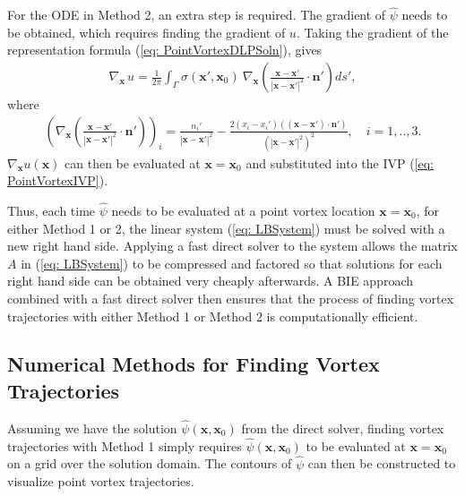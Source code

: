 \documentclass{sfuthesis}
\begin{document}
For the ODE in Method 2, an extra step is required. The gradient of $\hat{\psi}$ needs to be obtained, which requires finding the gradient of $u$.  
Taking the gradient of the representation formula (\ref{eq: PointVortexDLPSoln}), gives
\begin{align*}
	\nabla_{\mathbf{x}\ } u= \frac{1}{2\pi} \int_\Gamma \sigma(\mathbf{x}',\mathbf{x}_0) \ \nabla_{\mathbf{x}} \left(\frac{\mathbf{x}-\mathbf{x}'}{ {|\mathbf{x}-\mathbf{x}'|}^2} \cdot \mathbf{n}' \right) ds', 
\end{align*}
where 
\begin{align*}
	\left( \nabla_{\mathbf{x}} \left( \frac{ \mathbf{x}-\mathbf{x}'}{ {|\mathbf{x}-\mathbf{x}'|}^2} \cdot \mathbf{n}' \right) \right)_i = \frac{{n_i}'}{{|\mathbf{x}-\mathbf{x}'|}^2 } - \frac{2 (x_i -{x_i}') \left( (\mathbf{x}-\mathbf{x}') \cdot \mathbf{n}' \right)}{{({|\mathbf{x}- \mathbf{x}'|}^2)}^2}, \quad i=1,..,3.
\end{align*}
$\nabla_{\mathbf{x}} u(\mathbf{x})$ can then be evaluated at $\mathbf{x}=\mathbf{x}_0$ and substituted into the IVP (\ref{eq: PointVortexIVP}). 

Thus, each time $\hat{\psi}$ needs to be evaluated at a point vortex location $\mathbf{x}=\mathbf{x}_0$, for either Method 1 or 2, the linear system (\ref{eq: LBSystem}) must be solved with a new right hand side. Applying a fast direct solver to the system allows the matrix $A$ in (\ref{eq: LBSystem}) to be compressed and factored so that solutions for each right hand side can be obtained very cheaply afterwards. A BIE approach combined with a fast direct solver then ensures that the process of finding vortex trajectories with either Method 1 or Method 2 is computationally efficient. 


\subsection{Numerical Methods for Finding Vortex Trajectories} 
\label{sec: TrajNumMethods}
Assuming we have the solution $\hat{\psi}(\mathbf{x}, \mathbf{x}_0)$ from the direct solver, finding vortex trajectories with Method 1 simply requires $\hat{\psi}(\mathbf{x}, \mathbf{x}_0)$ to be evaluated at $\mathbf{x}=\mathbf{x}_0$ on a grid over the solution domain. The contours of $\hat{\psi}$ can then be constructed to visualize point vortex trajectories. 
\end{document}
